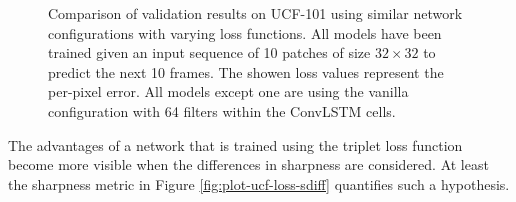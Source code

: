 \begin{figure}[htb]
\begin{subfigure}{0.5\textwidth}
  \modelD
  \modelE
  \hspace*{-0.6cm}
  {
  }
  \caption{}
  \label{fig:plot-ucf-loss-mae}
\end{subfigure}
\caption[Comparison of Losses on UCF-101]{Comparison of validation results on UCF-101 using similar network configurations with varying loss functions. All models have been trained given an input sequence of 10 patches of size $32 \times 32$ to predict the next 10 frames. The showen loss values represent the per-pixel error. All models except one are using the vanilla configuration with 64 filters within the ConvLSTM cells.} \label{fig:plot-ucf-loss}
\end{figure}

The advantages of a network that is trained using the triplet loss function become more visible when the differences in sharpness are considered. At least the sharpness metric in Figure \ref{fig:plot-ucf-loss-sdiff} quantifies such a hypothesis.



